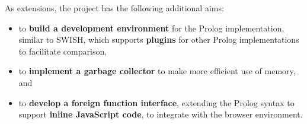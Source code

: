 As extensions, the project has the following additional aims:

\begin{itemize}
\item to \textbf{build a development environment} for the Prolog implementation, similar to SWISH, which supports \textbf{plugins} for other Prolog implementations to facilitate comparison,
\item to \textbf{implement a garbage collector} to make more efficient use of memory, and
\item to \textbf{develop a foreign function interface}, extending the Prolog syntax to support \textbf{inline JavaScript code}, to integrate with the browser environment.
\end{itemize}